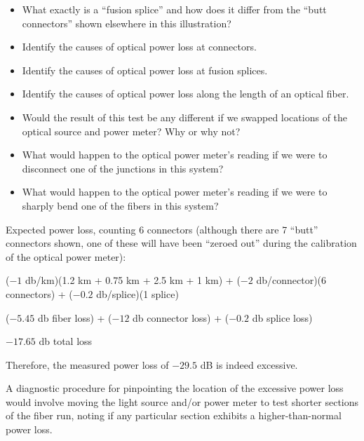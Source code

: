 \begin{itemize}
\item{} What exactly is a ``fusion splice'' and how does it differ from the ``butt connectors'' shown elsewhere in this illustration?
\item{} Identify the causes of optical power loss at connectors.
\item{} Identify the causes of optical power loss at fusion splices.
\item{} Identify the causes of optical power loss along the length of an optical fiber.
\item{} Would the result of this test be any different if we swapped locations of the optical source and power meter?  Why or why not?
\item{} What would happen to the optical power meter's reading if we were to disconnect one of the junctions in this system?
\item{} What would happen to the optical power meter's reading if we were to sharply bend one of the fibers in this system?
\end{itemize}







 






\noindent
Expected power loss, counting 6 connectors (although there are 7 ``butt'' connectors shown, one of these will have been ``zeroed out'' during the calibration of the optical power meter):

\vskip 10pt

($-1$ db/km)(1.2 km + 0.75 km + 2.5 km + 1 km) + ($-2$ db/connector)(6 connectors) + ($-0.2$ db/splice)(1 splice) 

\vskip 10pt

($-5.45$ db fiber loss) + ($-12$ db connector loss) + ($-0.2$ db splice loss) 

\vskip 10pt

$-17.65$ db total loss

\vskip 10pt

Therefore, the measured power loss of $-29.5$ dB is indeed excessive.

\vskip 10pt

A diagnostic procedure for pinpointing the location of the excessive power loss would involve moving the light source and/or power meter to test shorter sections of the fiber run, noting if any particular section exhibits a higher-than-normal power loss.

